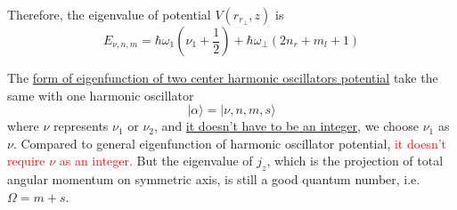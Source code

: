 Therefore, the eigenvalue of potential $V(r_{r_\perp}, z)$ is 
\begin{equation}
E_{\nu, n, m} = \hbar\omega_1(\nu_1 + \frac{1}{2}) + \hbar\omega_\perp (2n_r + m_l +1)
\end{equation}


The \underline{form of eigenfunction of two center harmonic oscillators potential} take the same with one harmonic oscillator
\begin{equation}
| \alpha \rangle = | \nu, n, m, s \rangle
\end{equation}
where $\nu$ represents $\nu_1$ or $\nu_2$, and \underline{it doesn't have to be an integer}, we choose $\nu_1$ as $\nu$. Compared to general eigenfunction of harmonic oscillator potential, \textcolor{red}{it doesn't require $\nu$ as an integer.} But the eigenvalue of $j_z$, which is the projection of total angular momentum on symmetric axis, is still a good quantum number, i.e. $\Omega = m + s$.

